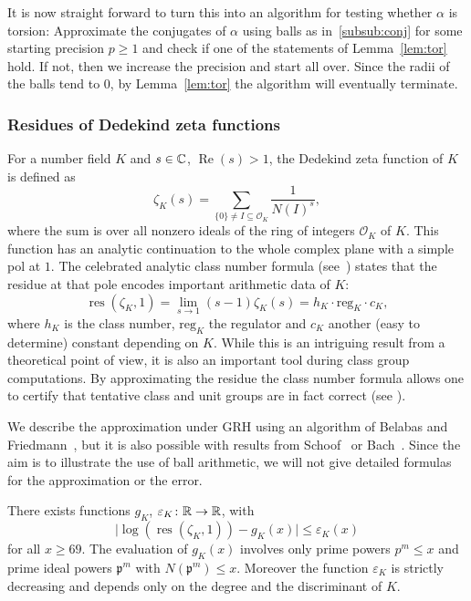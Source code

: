 \documentclass{sig-alternate-05-2015}
\begin{document}
It is now straight forward to turn this into an algorithm for testing whether $\alpha$ is torsion: Approximate the conjugates of $\alpha$ using balls as in~\ref{subsub:conj} for some starting precision $p \geq 1$ and check if one of the statements of Lemma~\ref{lem:tor} hold.
If not, then we increase the precision and start all over.
Since the radii of the balls tend to $0$, by Lemma~\ref{lem:tor} the algorithm will eventually terminate.

\subsubsection{Residues of Dedekind zeta functions}

For a number field $K$ and $s \in \mathbb{C}$, $\operatorname{Re}(s) > 1$, the Dedekind zeta function of $K$ is defined as
\[ \zeta_K(s) = \sum_{\{0\} \neq I \subseteq \mathcal O_K} \frac 1 {N(I)^s}, \]
where the sum is over all nonzero ideals of the ring of integers $\mathcal O_K$ of $K$.
This function has an analytic continuation to the whole complex plane with a simple pol at $1$. The celebrated analytic class number formula (see~\cite{Cohen1993}) states that the residue at that pole encodes important arithmetic data of $K$:
\[ \operatorname{res}(\zeta_K, 1) =\lim_{s \to 1}(s - 1)\zeta_K(s) = h_K \cdot \mathrm{reg}_K \cdot c_K, \]
where $h_K$ is the class number, $\mathrm{reg}_K$ the regulator and $c_K$ another (easy to determine) constant depending on $K$.
While this is an intriguing result from a theoretical point of view, it is also an important tool during class group computations.
By approximating the residue the class number formula allows one to certify that tentative class and unit groups are in fact correct (see \cite{Biasse2014}).

We describe the approximation under GRH using an algorithm of Belabas and Friedmann~\cite{Belabas2015}, but it is also possible with results from Schoof~\cite{Schoof1982} or Bach~\cite{Bach1995}.
Since the aim is to illustrate the use of ball arithmetic, we will not give detailed formulas for the approximation or the error.

\begin{theorem}
There exists functions $g_K$, $\varepsilon_K \colon \mathbb{R} \to \mathbb{R}$, with
\[ \lvert \log(\operatorname{res}(\zeta_K, 1)) - g_K(x) \rvert \leq \varepsilon_K(x) \]
for all $x \geq 69$. The evaluation of $g_K(x)$ involves only prime powers $p^m \leq x$ and prime ideal powers $\mathfrak p^m$ with $N(\mathfrak p^m) \leq x$.
Moreover the function $\varepsilon_K$ is strictly decreasing and depends only on the degree and the discriminant of $K$.
\end{theorem}
\end{document}
